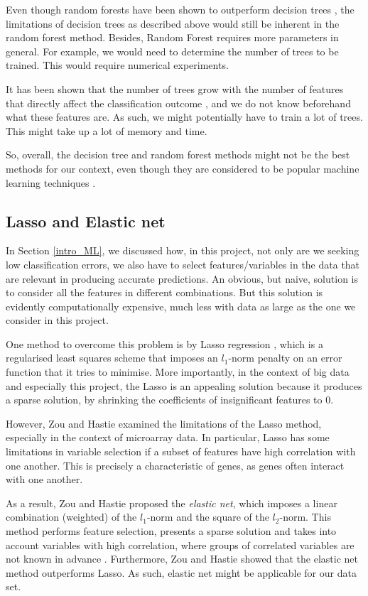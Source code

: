 \documentclass[12pt, twoside, a4paper]{report}
\begin{document}
Even though random forests have been shown to outperform decision trees \cite{RefWorks:103}, the limitations of decision trees as described above would still be inherent in the random forest method. Besides, Random Forest requires more parameters in general. For example, we would need to determine the number of trees to be trained. This would require numerical experiments.

It has been shown that the number of trees grow with the number of features that directly affect the classification outcome \cite{RefWorks:102}, and we do not know beforehand what these features are. As such, we might potentially have to train a lot of trees. This might take up a lot of memory and time.

So, overall, the decision tree and random forest methods might not be the best methods for our context, even though they are considered to be popular machine learning techniques \cite{RefWorks:103}.

\subsection{Lasso and Elastic net}
In Section \ref{intro_ML}, we discussed how, in this project, not only are we seeking low classification errors, we also have to select features/variables in the data that are relevant in producing accurate predictions. An obvious, but naive, solution is to consider all the features in different combinations. But this solution is evidently computationally expensive, much less with data as large as the one we consider in this project.

One method to overcome this problem is by Lasso regression \cite{RefWorks:94}, which is a regularised least squares scheme that imposes an $l_1$-norm penalty on an error function that it tries to minimise. More importantly, in the context of big data and especially this project, the Lasso is an appealing solution because it produces a sparse solution, by shrinking the coefficients of insignificant features to 0.

However, Zou and Hastie \cite{RefWorks:96} examined the limitations of the Lasso method, especially in the context of microarray data. In particular, Lasso has some limitations in variable selection if a subset of features have high correlation with one another. This is precisely a characteristic of genes, as genes often interact with one another.

As a result, Zou and Hastie proposed the \textit{elastic net}, which imposes a linear combination (weighted) of the $l_1$-norm and the square of the $l_2$-norm. This method performs feature selection, presents a sparse solution and takes into account variables with high correlation, where groups of correlated variables are not known in advance \cite{RefWorks:93}. Furthermore, Zou and Hastie showed that the elastic net method outperforms Lasso. As such, elastic net might be applicable for our data set.
\end{document}
